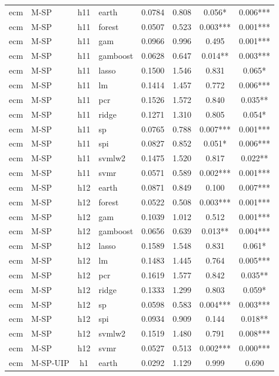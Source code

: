 \begin{ThreePartTable}
\begin{longtable}[t]{llclcccc}
\addlinespace
ecm & M-SP & h11 & earth & 0.0784 & 0.808 & 0.056* & 0.006***\\
ecm & M-SP & h11 & forest & 0.0507 & 0.523 & 0.003*** & 0.001***\\
ecm & M-SP & h11 & gam & 0.0966 & 0.996 & 0.495 & 0.001***\\
ecm & M-SP & h11 & gamboost & 0.0628 & 0.647 & 0.014** & 0.003***\\
ecm & M-SP & h11 & lasso & 0.1500 & 1.546 & 0.831 & 0.065*\\
ecm & M-SP & h11 & lm & 0.1414 & 1.457 & 0.772 & 0.006***\\
ecm & M-SP & h11 & pcr & 0.1526 & 1.572 & 0.840 & 0.035**\\
ecm & M-SP & h11 & ridge & 0.1271 & 1.310 & 0.805 & 0.054*\\
ecm & M-SP & h11 & sp & 0.0765 & 0.788 & 0.007*** & 0.001***\\
ecm & M-SP & h11 & spi & 0.0827 & 0.852 & 0.051* & 0.006***\\
ecm & M-SP & h11 & svmlw2 & 0.1475 & 1.520 & 0.817 & 0.022**\\
ecm & M-SP & h11 & svmr & 0.0571 & 0.589 & 0.002*** & 0.001***\\
\addlinespace
ecm & M-SP & h12 & earth & 0.0871 & 0.849 & 0.100 & 0.007***\\
ecm & M-SP & h12 & forest & 0.0522 & 0.508 & 0.003*** & 0.001***\\
ecm & M-SP & h12 & gam & 0.1039 & 1.012 & 0.512 & 0.001***\\
ecm & M-SP & h12 & gamboost & 0.0656 & 0.639 & 0.013** & 0.004***\\
ecm & M-SP & h12 & lasso & 0.1589 & 1.548 & 0.831 & 0.061*\\
ecm & M-SP & h12 & lm & 0.1483 & 1.445 & 0.764 & 0.005***\\
ecm & M-SP & h12 & pcr & 0.1619 & 1.577 & 0.842 & 0.035**\\
ecm & M-SP & h12 & ridge & 0.1333 & 1.299 & 0.803 & 0.059*\\
ecm & M-SP & h12 & sp & 0.0598 & 0.583 & 0.004*** & 0.003***\\
ecm & M-SP & h12 & spi & 0.0934 & 0.909 & 0.144 & 0.018**\\
ecm & M-SP & h12 & svmlw2 & 0.1519 & 1.480 & 0.791 & 0.008***\\
ecm & M-SP & h12 & svmr & 0.0527 & 0.513 & 0.002*** & 0.000***\\
\addlinespace
ecm & M-SP-UIP & h1 & earth & 0.0292 & 1.129 & 0.999 & 0.690\\

\end{longtable}
\end{ThreePartTable}

